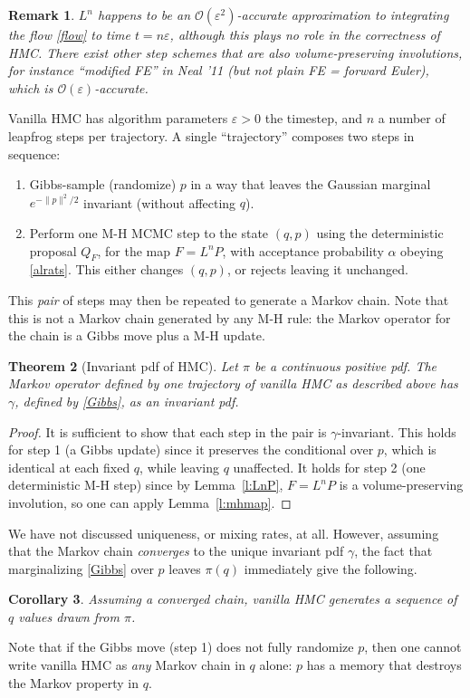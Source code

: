 \documentclass[10pt]{article}
\newcommand{\ben}{\begin{enumerate}}
\newcommand{\een}{\end{enumerate}}
\newcommand{\bigO}{{\mathcal O}}
\newtheorem{thm}{Theorem}
\newtheorem{cor}[thm]{Corollary}
\newtheorem{rmk}[thm]{Remark}
\newcommand{\al}{\alpha}
\newcommand{\eps}{\varepsilon}
\begin{document}
\begin{rmk}
  $L^n$ happens to be
  an $\bigO(\eps^2)$-accurate approximation to integrating the
  flow \eqref{flow} to time $t = n\eps$,
  although this plays no role in the correctness of HMC.
  There exist other step schemes that are also volume-preserving involutions,
  for instance ``modified FE'' in Neal '11 (but not plain FE = forward Euler),
  which is $\bigO(\eps)$-accurate.
\end{rmk}

Vanilla HMC has algorithm parameters $\eps>0$ the timestep, and $n$ a number of leapfrog steps per trajectory.
A single ``trajectory'' composes two steps in sequence:
\ben
\item Gibbs-sample (randomize) $p$ in a way that leaves the
  Gaussian marginal $e^{-\|p\|^2/2}$ invariant (without affecting $q$).
\item Perform one M-H MCMC step to the state $(q,p)$
  using the deterministic proposal $Q_F$, for the map $F = L^n P$,
  with acceptance probability $\al$ obeying \eqref{alrats}.
  This either changes $(q,p)$, or rejects leaving it unchanged.
\een
This {\em pair} of steps may then be repeated to generate a Markov chain.
Note that this is not a Markov chain generated by any
M-H rule: the Markov operator for the chain is a Gibbs move plus a M-H update.

\begin{thm}[Invariant pdf of HMC]
  Let $\pi$ be a continuous positive pdf.
  The Markov operator defined by one trajectory of vanilla HMC as
  described above has $\gamma$,
  defined by \eqref{Gibbs}, as an invariant pdf.
  \label{t:hmc}
\end{thm}
\begin{proof}
  It is sufficient to show that each step in the pair is $\gamma$-invariant.
  This holds for step 1 (a Gibbs update) since it preserves the conditional
  over $p$, which is identical at each fixed $q$, while leaving $q$ unaffected.
  It holds for step 2 (one deterministic M-H step) since by
  Lemma~\ref{l:LnP}, $F=L^n P$
  is a volume-preserving involution, so one can apply Lemma~\ref{l:mhmap}.
\end{proof}

We have not discussed uniqueness, or mixing rates, at all.
However, assuming that the Markov chain {\em converges} to the
unique invariant pdf $\gamma$,
the fact that marginalizing \eqref{Gibbs} over $p$ leaves $\pi(q)$
immediately give the following.

\begin{cor}
  Assuming a converged chain,
  vanilla HMC generates a sequence of $q$ values drawn from $\pi$.
\end{cor}
Note that if the Gibbs move (step 1) does not fully randomize $p$,
then one cannot write vanilla HMC as {\em any} Markov chain in $q$ alone:
$p$ has a memory that destroys the Markov property in $q$.
\end{document}

